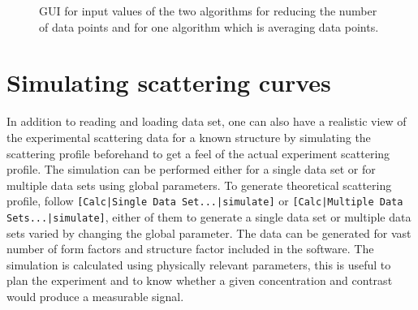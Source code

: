 \begin{figure}[htb]
\centering
\caption{GUI for input values of the two algorithms for reducing the number of data points and for one algorithm which is averaging data points.}
\label{fig:DataReductionOption}
\end{figure}

\section{Simulating scattering curves}

In addition to reading and loading data set, one can also have a
realistic view of the experimental scattering data for a known
structure by simulating the scattering profile beforehand to get a
feel of the actual experiment scattering profile. The simulation can
be performed either for a single data set or for multiple data sets
using global parameters. To generate theoretical scattering profile,
follow \verb"[Calc|Single Data Set...|simulate]" or
\verb"[Calc|Multiple Data Sets...|simulate]", either of them to generate
a single data set or multiple data sets varied by changing the global parameter. The
data can be generated for vast number of form factors and structure
factor included in the software. The simulation is calculated using
physically relevant parameters, this is useful to plan the
experiment and to know whether a given concentration and contrast
would produce a measurable signal.

